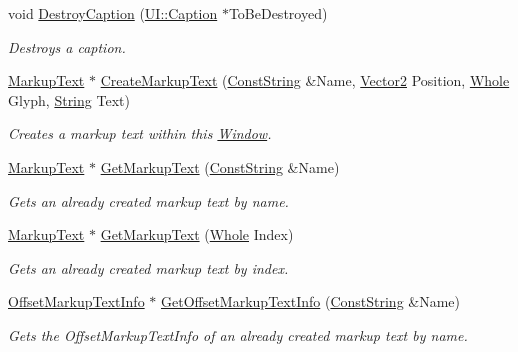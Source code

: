 \begin{DoxyCompactItemize}
void \hyperlink{classphys_1_1UI_1_1Window_a4e3dbe56ca1efce7ac1d26ceb8f7e915}{DestroyCaption} (\hyperlink{classphys_1_1UI_1_1Caption}{UI::Caption} $\ast$ToBeDestroyed)
\begin{DoxyCompactList}\small\item\em Destroys a caption. \item\end{DoxyCompactList}\item 
\hyperlink{classphys_1_1UI_1_1MarkupText}{MarkupText} $\ast$ \hyperlink{classphys_1_1UI_1_1Window_ad8750e7e7eed2ef68b2e5abb19075c62}{CreateMarkupText} (\hyperlink{namespacephys_a5ce5049f8b4bf88d6413c47b504ebb31}{ConstString} \&Name, \hyperlink{classphys_1_1Vector2}{Vector2} Position, \hyperlink{namespacephys_a460f6bc24c8dd347b05e0366ae34f34a}{Whole} Glyph, \hyperlink{namespacephys_aa03900411993de7fbfec4789bc1d392e}{String} Text)
\begin{DoxyCompactList}\small\item\em Creates a markup text within this \hyperlink{classphys_1_1UI_1_1Window}{Window}. \item\end{DoxyCompactList}\item 
\hyperlink{classphys_1_1UI_1_1MarkupText}{MarkupText} $\ast$ \hyperlink{classphys_1_1UI_1_1Window_af5bf2246915fc68558d2a68ed016a68b}{GetMarkupText} (\hyperlink{namespacephys_a5ce5049f8b4bf88d6413c47b504ebb31}{ConstString} \&Name)
\begin{DoxyCompactList}\small\item\em Gets an already created markup text by name. \item\end{DoxyCompactList}\item 
\hyperlink{classphys_1_1UI_1_1MarkupText}{MarkupText} $\ast$ \hyperlink{classphys_1_1UI_1_1Window_a119b5ff513cb70d4190b3ccdfa980ac2}{GetMarkupText} (\hyperlink{namespacephys_a460f6bc24c8dd347b05e0366ae34f34a}{Whole} Index)
\begin{DoxyCompactList}\small\item\em Gets an already created markup text by index. \item\end{DoxyCompactList}\item 
\hyperlink{structphys_1_1UI_1_1ResizingInfo}{OffsetMarkupTextInfo} $\ast$ \hyperlink{classphys_1_1UI_1_1Window_a9906bb131f631af0a9aed7dbb7744112}{GetOffsetMarkupTextInfo} (\hyperlink{namespacephys_a5ce5049f8b4bf88d6413c47b504ebb31}{ConstString} \&Name)
\begin{DoxyCompactList}\small\item\em Gets the OffsetMarkupTextInfo of an already created markup text by name. \item\end{DoxyCompactList}\item 

\end{DoxyCompactItemize}
